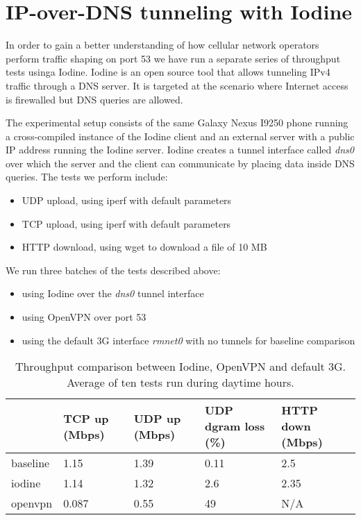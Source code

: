 
\section{IP-over-DNS tunneling with Iodine}

In order to gain a better understanding of how cellular network operators
perform traffic shaping on port 53 we have run a separate series of throughput
tests usinga Iodine. Iodine is an open source tool that allows tunneling IPv4
traffic through a DNS server. It is targeted at the scenario where Internet access is firewalled but DNS queries are allowed.

The experimental setup consists of the same Galaxy Nexus I9250 phone running a
cross-compiled instance of the Iodine client and an external server with a
public IP address running the Iodine server. Iodine creates  a tunnel interface called \textit{dns0} over which the server and the client can communicate by placing data inside DNS queries. The tests we perform include:

\begin{itemize}
\item UDP upload, using iperf with default parameters
\item TCP upload, using iperf with default parameters
\item HTTP download, using wget to download a file of 10 MB
\end{itemize}

We run three batches of the tests described above:

\begin{itemize}
\item using Iodine over the \textit{dns0} tunnel interface
\item using OpenVPN over port 53
\item using the default 3G interface \textit{rmnet0} with no tunnels for baseline comparison
\end{itemize}


\begin{center}
	\begin{table}[htb]
	\centering
	\begin{tabular}{ | l | l | l | l | l | }
	\hline
	& TCP up (Mbps) & UDP up (Mbps) & UDP dgram loss (\%) & HTTP down (Mbps) \\ \hline
	baseline & 1.15 & 1.39 &  0.11 & 2.5 \\ \hline
	iodine & 1.14 & 1.32 & 2.6 & 2.35 \\ \hline
	openvpn & 0.087 & 0.55 & 49 & N/A \\ \hline
	\end{tabular}
	\caption{Throughput comparison between Iodine, OpenVPN and default 3G. Average of ten tests run during daytime hours.}
	\label{table:iodine}
	\end{table}
\end{center}
	
